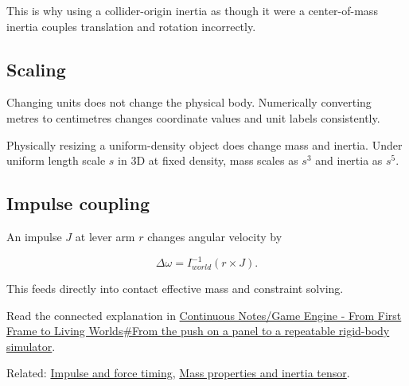 This is why using a collider-origin inertia as though it were a center-of-mass inertia couples translation and rotation incorrectly.

\subsection{Scaling}\label{appendix-66742099f8a0-scaling}

Changing units does not change the physical body. Numerically converting metres to centimetres changes coordinate values and unit labels consistently.

Physically resizing a uniform-density object does change mass and inertia. Under uniform length scale \(s\) in 3D at fixed density, mass scales as \(s^3\) and inertia as \(s^5\).

\subsection{Impulse coupling}\label{appendix-66742099f8a0-impulse-coupling}

An impulse \(J\) at lever arm \(r\) changes angular velocity by

\[
\Delta\omega=I^{-1}_{world}(r\times J).
\]

This feeds directly into contact effective mass and constraint solving.

Read the connected explanation in \hyperref[06-engine-ii-ch034-from-the-push-on-a-panel-to-a-repeatable-rigid-body-simulator]{Continuous Notes/Game Engine - From First Frame to Living Worlds\#From the push on a panel to a repeatable rigid-body simulator}.

Related: \hyperref[appendix-c39931e6e4c2]{Impulse and force timing}, \hyperref[06-engine-ii-ch035-part-1637-composite-body-mass-properties]{Mass properties and inertia tensor}.
